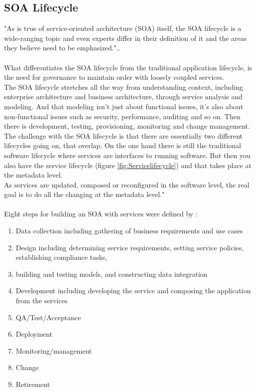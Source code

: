 \documentclass[12pt]{article}
\begin{document}
\subsection{SOA Lifecycle}
"As is true of service-oriented architecture (SOA) itself, the SOA lifecycle is a wide-ranging topic and even experts differ in their definition of it and the areas they believe need to be emphasized.",\cite{soalycman}.\\\\
What differentiates the SOA lifecycle from the traditional application lifecycle, is the need for governance to maintain order with loosely coupled services.\cite{soalycman}
\\
The SOA lifecycle stretches all the way from understanding context, including enterprise architecture and business architecture, through service analysis and modeling. And that modeling isn't just about functional issues, it's also about non-functional issues such as security, performance, auditing and so on. Then there is development, testing, provisioning, monitoring and change management. \cite{soalycman}\\
The challenge with the SOA lifecycle is that there are essentially two different lifecycles going on, that overlap. On the one hand there is still the traditional software lifecycle where services are interfaces to running software. But then you also have the service lifecycle (figure \ref{fig:Servicelifecycle}) and that takes place at the metadata level.\\
As services are updated, composed or reconfigured in the software level, the real goal is to do all the changing at the metadata level."\cite{soalycman}\\
\\
Eight steps for building an SOA with services were defined by \cite{soalycman}:
\begin{enumerate}
\item Data collection including gathering of business requirements and use cases
\item Design including determining service requirements, setting service policies, establishing compliance tasks, \item building and testing models, and constructing data integration
\item Development including developing the service and composing the application from the services
\item QA/Test/Acceptance
\item Deployment
\item Monitoring/management
\item Change
\item Retirement
\end{enumerate}
	
\end{document}

